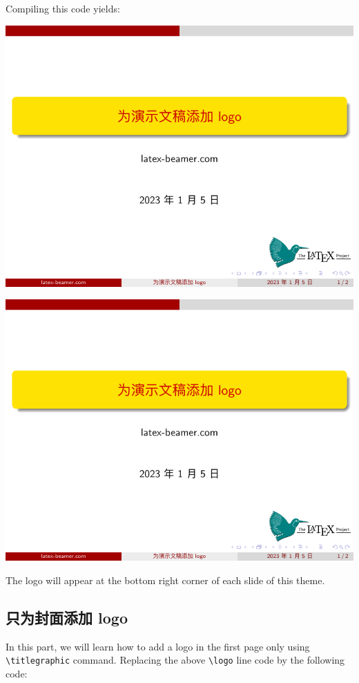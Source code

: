 Compiling this code yields:

\includegraphics[page=1]{examples/beamer/logo-for-all-pages.pdf}

\includegraphics[page=2]{examples/beamer/logo-for-all-pages.pdf}

The logo will appear at the bottom right corner of each slide of this theme.

\subsection{只为封面添加 logo}

In this part, we will learn how to add a logo in the first page only using \verb|\titlegraphic| command. Replacing the above \verb|\logo| line code by the following code:

